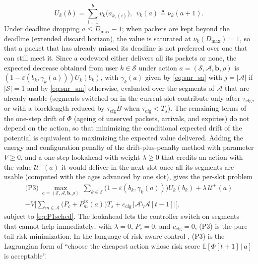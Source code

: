 \documentclass[journal]{IEEEtran}
\newcommand{\E}{\mathbb{E}}
\newcommand{\Dmax}{D_{\max}}
\newcommand{\vect}[1]{\bm{#1}}
\newcommand{\Sset}{\mathcal{S}}
\begin{document}
\begin{equation}\label{eq:U}
U_k(b)=\sum_{i=1}^{b}v_k\big(a_{k,(i)}\big),\ \ v_k(a)\triangleq\nu_k(a+1).
\end{equation}
Under deadline dropping $a\le\Dmax-1$; when packets are kept beyond the deadline (extended discard horizon), the value is saturated at $\nu_k(\Dmax)=1$, so that a packet that has already missed its deadline is not preferred over one that can still meet it. Since a codeword either delivers all its packets or none, the expected decrease obtained from user $k\in\Sset$ under action $a=(\Sset,\mathcal A,\vect b,\rho)$ is $(1-\varepsilon(b_k,\gamma_k(a)))U_k(b_k)$, with $\gamma_k(a)$ given by \eqref{eq:snr_sa} with $j=|\mathcal A|$ if $|\Sset|=1$ and by \eqref{eq:snr_sm} otherwise, evaluated over the segments of $\mathcal A$ that are already usable (segments switched on in the current slot contribute only after $\tau_{\mathrm{cfg}}$, or with a blocklength reduced by $\tau_{\mathrm{cfg}}B$ when $\tau_{\mathrm{cfg}}<T_s$). The remaining terms of the one-step drift of $\Phi$ (ageing of unserved packets, arrivals, and expiries) do not depend on the action, so that minimizing the conditional expected drift of the potential is equivalent to maximizing the expected value delivered. Adding the energy and configuration penalty of the drift-plus-penalty method \cite{Neely2010} with parameter $V\ge0$, and a one-step lookahead with weight $\lambda\ge0$ that credits an action with the value $\mathcal U^{+}(a)$ it would deliver in the next slot once all its segments are usable (computed with the ages advanced by one slot), gives the per-slot problem
\begin{multline}\label{eq:P3}
\text{(P3)}\ \max_{a=(\Sset,\mathcal A,\vect b,\rho)}\ \sum_{k\in\Sset}\big(1-\varepsilon(b_k,\gamma_k(a))\big)U_k(b_k)+\lambda\,\mathcal U^{+}(a)\\-V\Big[\sum_{m\in\mathcal A}\big(P_c+P_m^{\mathrm{tx}}(a)\big)T_s+c_{\mathrm{cfg}}\,|\mathcal A\setminus\mathcal A[t-1]|\Big],
\end{multline}
subject to \eqref{eq:P1sched}. The lookahead lets the controller switch on segments that cannot help immediately; with $\lambda=0$, $P_c=0$, and $c_{\mathrm{cfg}}=0$, (P3) is the pure tail-risk minimization. In the language of risk-aware control \cite{Bennis2018}, (P3) is the Lagrangian form of ``choose the cheapest action whose risk score $\E[\Phi[t+1]\,|\,a]$ is acceptable''.
\end{document}
